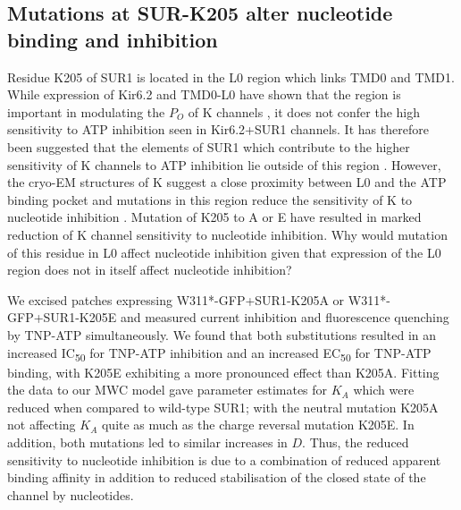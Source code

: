 \subsection{Mutations at SUR-K205 alter nucleotide binding and inhibition}

Residue K205 of SUR1 is located in the L0 region which links TMD0 and TMD1.
While expression of Kir6.2 and TMD0-L0 have shown that the region is important in modulating the $P_O$ of K\ATP{} channels \cite{babenko_sur_2003, chan_n-terminal_2003-1, pratt_n-terminal_2011}, it does not confer the high sensitivity to ATP inhibition seen in Kir6.2+SUR1 channels.
It has therefore been suggested that the elements of SUR1 which contribute to the higher sensitivity of K\ATP{} channels to ATP inhibition lie outside of this region \cite{babenko_sur_2003, pratt_engineered_2012-1}.
However, the cryo-EM structures of K\ATP{} suggest a close proximity between L0 and the ATP binding pocket \cite{martin_anti-diabetic_2017-1, lee_molecular_2017-1, li_structure_2017} and mutations in this region reduce the sensitivity of K\ATP{} to nucleotide inhibition \cite{ding_structural_2019,pratt_engineered_2012-1, masia_mutation_2007}.
Mutation of K205 to A \cite{ding_structural_2019} or E \cite{ding_structural_2019} have resulted in marked reduction of K\ATP{} channel sensitivity to nucleotide inhibition.
Why would mutation of this residue in L0 affect nucleotide inhibition given that expression of the L0 region does not in itself affect nucleotide inhibition?

We excised patches expressing W311*-GFP+SUR1-K205A or W311*-GFP+SUR1-K205E and measured current inhibition and fluorescence quenching by TNP-ATP simultaneously.
We found that both substitutions resulted in an increased IC\textsubscript{50} for TNP-ATP inhibition and an increased EC\textsubscript{50} for TNP-ATP binding, with K205E exhibiting a more pronounced effect than K205A.
Fitting the data to our MWC model gave parameter estimates for $K_A$ which were reduced when compared to wild-type SUR1; with the neutral mutation K205A not affecting $K_A$ quite as much as the charge reversal mutation K205E.
In addition, both mutations led to similar increases in $D$.
Thus, the reduced sensitivity to nucleotide inhibition is due to a combination of reduced apparent binding affinity in addition to reduced stabilisation of the closed state of the channel by nucleotides. 

